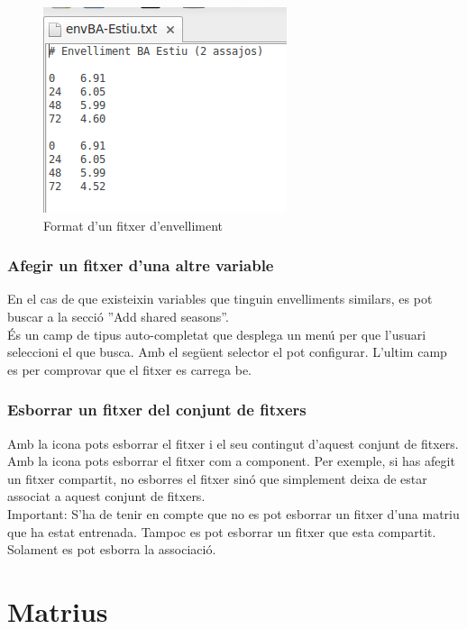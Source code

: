 \begin{figure}[h!]
  \centering
  \includegraphics[scale=0.5]{img/userguide/envelliment.png}
  \caption{Format d'un fitxer d'envelliment}
  \label{fig:envelliment}
\end{figure}

\subsubsection{Afegir un fitxer d'una altre variable}
En el cas de que existeixin variables que tinguin envelliments similars, es pot buscar a la secció ''Add shared seasons''.\\

\'{E}s un camp de tipus auto-completat que desplega un menú per que l'usuari seleccioni el que busca. Amb el següent selector el pot configurar. L'ultim camp es per comprovar que el fitxer es carrega be.

\subsubsection{Esborrar un fitxer del conjunt de fitxers}
Amb la icona \icontrash pots esborrar el fitxer i el seu contingut d'aquest conjunt de fitxers.\\

Amb la icona \iconremove pots esborrar el fitxer com a component. Per exemple, si has afegit un fitxer compartit, no esborres el fitxer sinó que simplement deixa de estar associat a aquest conjunt de fitxers.\\

Important: S'ha de tenir en compte que no es pot esborrar un fitxer d'una matriu que ha estat entrenada. Tampoc es pot esborrar un fitxer que esta compartit. Solament es pot esborra la associació.
\section{Matrius}

